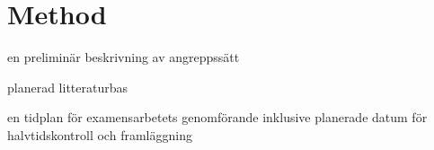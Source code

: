 \chapter{Method}\label{cha:metod}

en preliminär beskrivning av angreppssätt

planerad litteraturbas

en tidplan för examensarbetets genomförande inklusive planerade datum för halvtidskontroll och framläggning
